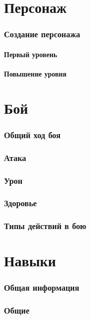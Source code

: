 \documentclass[10pt,twoside,twocolumn,openany]{book}
\begin{document}
\selectfont
\tableofcontents

\clearpage
\part{Персонаж}
\section{Создание персонажа}
\lipsum[1]
\subsection{Первый уровень}
\lipsum[1]
\subsection{Повышение уровня}
\lipsum[1]

\part{Бой}
\section{Общий ход боя}
\lipsum[1]
\section{Атака}
\lipsum[1]
\section{Урон}
\lipsum[1]
\section{Здоровье}
\lipsum[1]
\section{Типы действий в бою}
\lipsum[1]

\part{Навыки}
\section{Общая информация}
\lipsum[1]
\section{Общие}
\lipsum[1]
\end{document}
